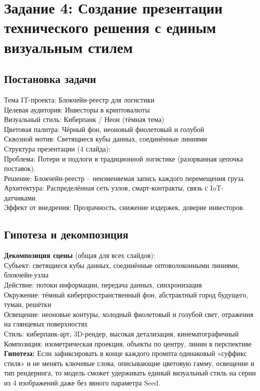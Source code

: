\newpage
\section*{Задание 4: Создание презентации технического решения с единым визуальным стилем}
\subsection{Постановка задачи}
\noindent
Тема IT-проекта:	Блокчейн-реестр для логистики \\
Целевая аудитория: Инвесторы в криптовалюты \\
Визуальный стиль: Киберпанк / Неон (тёмная тема) \\
Цветовая палитра: Чёрный фон, неоновый фиолетовый и голубой \\
Сквозной мотив: Светящиеся кубы данных, соединённые линиями \\
\newline
\indent
Структура презентации (4 слайда): \\
Проблема: Потери и подлоги в традиционной логистике (разорванная цепочка поставок). \\
Решение: Блокчейн-реестр – неизменяемая запись каждого перемещения груза. \\
Архитектура: Распределённая сеть узлов, смарт-контракты, связь с IoT-датчиками. \\
Эффект от внедрения: Прозрачность, снижение издержек, доверие инвесторов. \\
\subsection{Гипотеза и декомпозиция}
\indent
\textbf{Декомпозиция сцены} (общая для всех слайдов):\\
Субъект: светящиеся кубы данных, соединённые оптоволоконными линиями, блокчейн-узлы \\
Действие: потоки информации, передача данных, синхронизация\\
Окружение: тёмный киберпространственный фон, абстрактный город будущего, туман, решётки\\
Освещение: неоновые контуры, холодный фиолетовый и голубой свет, отражения на глянцевых поверхностях\\
Стиль: киберпанк-арт, 3D-рендер, высокая детализация, кинематографичный\\
Композиция: изометрическая проекция, объекты по центру, линии в перспективе
\newpage
\textbf{Гипотеза:} Если зафиксировать в конце каждого промпта одинаковый «суффикс стиля» и не менять ключевые слова, описывающие цветовую гамму, освещение и тип рендеринга, то модель сможет удерживать единый визуальный стиль на серии из 4 изображений даже без явного параметра Seed.
